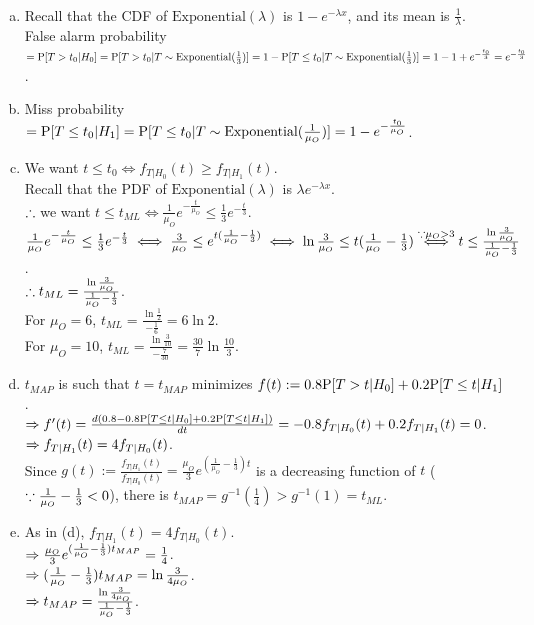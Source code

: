 \begin{pr}$ $
\begin{enumerate}[(a)]
\item Recall that the CDF of $\mathrm{Exponential}(\lambda)$ is $1-e^{-\lambda x}$, and its mean is $\frac1\lambda$.\\
False alarm probability $=\P[T>t_0|H_0]=\P[T>t_0|T\sim\mathrm{Exponential}(\frac13)]=1-\P[T\leq t_0|T\sim\mathrm{Exponential}(\frac13)]=1-1+e^{-\frac{t_0}3}=e^{-\frac{t_0}3}$.
\item Miss probability $=\P[T\leq t_0|H_1]=\P[T\leq t_0|T\sim\mathrm{Exponential}(\frac1{\mu_O})]=1-e^{-\frac{t_0}{\mu_O}}$.
\item We want $t\leq t_0\iff f_{T|H_0}(t)\geq f_{T|H_1}(t)$.\\
Recall that the PDF of $\mathrm{Exponential}(\lambda)$ is $\lambda e^{-\lambda x}$.\\
$\so$ we want $t\leq t_{ML}\iff\frac1{\mu_O}e^{-\frac t{\mu_O}}\leq\frac13e^{-\frac t3}$.\\
$\frac1{\mu_O}e^{-\frac t{\mu_O}}\leq\frac13e^{-\frac t3}\iff\frac3{\mu_O}\leq e^{t(\frac1{\mu_O}-\frac13)}\iff\ln\frac3{\mu_O}\leq t(\frac1{\mu_O}-\frac13)\overset{\cuz\mu_O>3}\iff t\leq\frac{\ln\frac3{\mu_O}}{\frac1{\mu_O}-\frac13}$.\\
$\so t_{ML}=\frac{\ln\frac3{\mu_O}}{\frac1{\mu_O}-\frac13}$.\\
For $\mu_O=6$, $t_{ML}=\frac{\ln\frac12}{-\frac16}=6\ln2$.\\
For $\mu_O=10$, $t_{ML}=\frac{\ln\frac3{10}}{-\frac7{30}}=\frac{30}7\ln\frac{10}3$.
\item $t_{MAP}$ is such that $t=t_{MAP}$ minimizes $f(t):=0.8\P[T>t|H_0]+0.2\P[T\leq t|H_1]$.\\
$\then f'(t)=\frac{d(0.8-0.8\P[T\leq t|H_0]+0.2\P[T\leq t|H_1])}{dt}=-0.8f_{T|H_0}(t)+0.2f_{T|H_1}(t)=0$.\\
$\then f_{T|H_1}(t)=4f_{T|H_0}(t)$.\\
Since $g(t):=\frac{f_{T|H_1}(t)}{f_{T|H_0}(t)}=\frac{\mu_O}3e^{(\frac1{\mu_O}-\frac13)t}$ is a decreasing function of $t$ ($\cuz\frac1{\mu_O}-\frac13<0$), there is $t_{MAP}=g^{-1}(\frac14)>g^{-1}(1)=t_{ML}$.
\item As in (d), $f_{T|H_1}(t)=4f_{T|H_0}(t)$.\\
$\then\frac{\mu_O}3e^{(\frac1{\mu_O}-\frac13)t_{MAP}}=\frac14$.\\
$\then(\frac1{\mu_O}-\frac13)t_{MAP}=\ln\frac3{4\mu_O}$.\\
$\then t_{MAP}=\frac{\ln\frac3{4\mu_O}}{\frac1{\mu_O}-\frac13}$.\\

\end{enumerate}
\end{pr}
